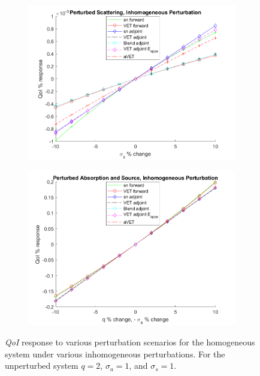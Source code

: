\documentclass[12pt]{report}
\newcommand{\sigs}{\sigma_s}
\newcommand{\siga}{\sigma_a}
\newcommand{\qoi}{{\it QoI}\xspace}
\begin{document}
\begin{figure}[H]
\begin{subfigure}{.5\textwidth}
  \includegraphics[width=.98\linewidth]{figures2/23sigsSens.png}
\end{subfigure}%
\begin{subfigure}{.5\textwidth}
  \centering
  \includegraphics[width=.98\linewidth]{figures2/23qsigaSens.png}
\end{subfigure}
\caption{\qoi response to various perturbation scenarios for the homogeneous system under various inhomogeneous perturbations. For the unperturbed system $q=2$, $\siga=1$, and $\sigs=1$.}
\label{fig:Trial2}
\end{figure}
\end{document}
